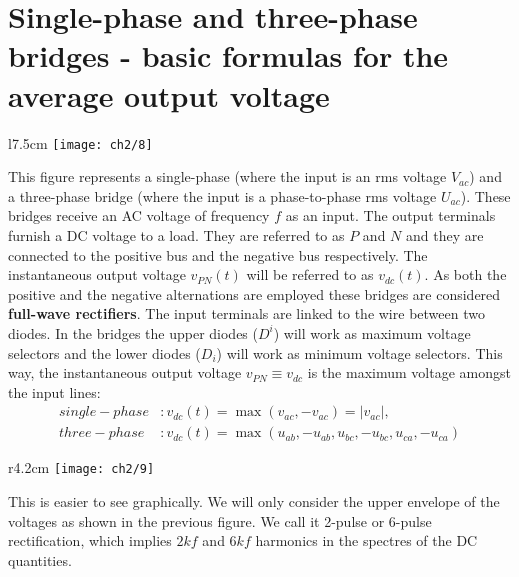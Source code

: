 \section{Single-phase and three-phase bridges - basic formulas for the average output voltage}
	\begin{wrapfigure}[7]{l}{7.5cm}
	\vspace{-5mm}
	\texttt{[image: ch2/8]}
	\end{wrapfigure} 
	This figure represents a single-phase (where the input is an rms voltage $V_{ac}$) and a three-phase bridge (where the input is a phase-to-phase rms voltage $U_{ac}$). These bridges receive an AC voltage of frequency $f$ as an input. The output terminals furnish a DC voltage to a load. They are referred to as $P$ and $N$ and they are connected to the positive bus and the negative bus respectively. The instantaneous output voltage $v_{PN}(t)$ will be referred to as $v_{dc}(t)$. As both the positive and the negative alternations are employed these bridges are considered \textbf{full-wave rectifiers}. The input terminals are linked to the wire between two diodes. In the bridges the upper diodes ($D^i$) will work as maximum voltage selectors and the lower diodes ($D_i$) will work as minimum voltage selectors. This way, the instantaneous output voltage $v_{PN} \equiv v_{dc}$ is the maximum voltage amongst the input lines: 
	\begin{equation}
	\begin{aligned}
		single-phase &: v_{dc}(t) = \max (v_{ac}, -v_{ac}) = |v_{ac}|,\\
		three-phase &: v_{dc}(t) = \max (u_{ab}, -u_{ab}, u_{bc}, -u_{bc}, u_{ca}, -u_{ca})
	\end{aligned}
	\end{equation}
	
	\begin{wrapfigure}[10]{r}{4.2cm}
	\vspace{-5mm}
	\texttt{[image: ch2/9]}
	\end{wrapfigure} 			
	This is easier to see graphically. We will only consider the upper envelope of the voltages as shown in the previous figure. We call it 2-pulse or 6-pulse rectification, which implies $2kf$ and $6kf$ harmonics in the spectres of the DC quantities.
	
